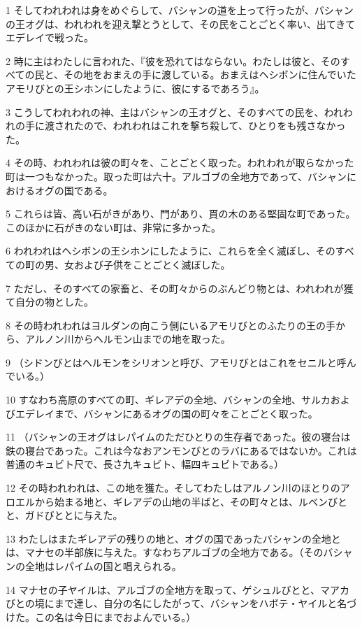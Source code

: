 \par 1 そしてわれわれは身をめぐらして、バシャンの道を上って行ったが、バシャンの王オグは、われわれを迎え撃とうとして、その民をことごとく率い、出てきてエデレイで戦った。
\par 2 時に主はわたしに言われた、『彼を恐れてはならない。わたしは彼と、そのすべての民と、その地をおまえの手に渡している。おまえはヘシボンに住んでいたアモリびとの王シホンにしたように、彼にするであろう』。
\par 3 こうしてわれわれの神、主はバシャンの王オグと、そのすべての民を、われわれの手に渡されたので、われわれはこれを撃ち殺して、ひとりをも残さなかった。
\par 4 その時、われわれは彼の町々を、ことごとく取った。われわれが取らなかった町は一つもなかった。取った町は六十。アルゴブの全地方であって、バシャンにおけるオグの国である。
\par 5 これらは皆、高い石がきがあり、門があり、貫の木のある堅固な町であった。このほかに石がきのない町は、非常に多かった。
\par 6 われわれはヘシボンの王シホンにしたように、これらを全く滅ぼし、そのすべての町の男、女および子供をことごとく滅ぼした。
\par 7 ただし、そのすべての家畜と、その町々からのぶんどり物とは、われわれが獲て自分の物とした。
\par 8 その時われわれはヨルダンの向こう側にいるアモリびとのふたりの王の手から、アルノン川からヘルモン山までの地を取った。
\par 9 （シドンびとはヘルモンをシリオンと呼び、アモリびとはこれをセニルと呼んでいる。）
\par 10 すなわち高原のすべての町、ギレアデの全地、バシャンの全地、サルカおよびエデレイまで、バシャンにあるオグの国の町々をことごとく取った。
\par 11 （バシャンの王オグはレパイムのただひとりの生存者であった。彼の寝台は鉄の寝台であった。これは今なおアンモンびとのラバにあるではないか。これは普通のキュビト尺で、長さ九キュビト、幅四キュビトである。）
\par 12 その時われわれは、この地を獲た。そしてわたしはアルノン川のほとりのアロエルから始まる地と、ギレアデの山地の半ばと、その町々とは、ルベンびとと、ガドびととに与えた。
\par 13 わたしはまたギレアデの残りの地と、オグの国であったバシャンの全地とは、マナセの半部族に与えた。すなわちアルゴブの全地方である。（そのバシャンの全地はレパイムの国と唱えられる。
\par 14 マナセの子ヤイルは、アルゴブの全地方を取って、ゲシュルびとと、マアカびとの境にまで達し、自分の名にしたがって、バシャンをハボテ・ヤイルと名づけた。この名は今日にまでおよんでいる。）
